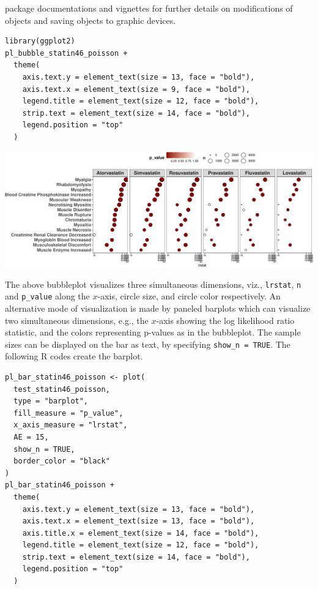 package documentations and vignettes for further details on modifications of  objects and saving  objects to graphic devices.

\begin{verbatim}
library(ggplot2)
pl_bubble_statin46_poisson +
  theme(
    axis.text.y = element_text(size = 13, face = "bold"),
    axis.text.x = element_text(size = 9, face = "bold"),
    legend.title = element_text(size = 12, face = "bold"),
    strip.text = element_text(size = 14, face = "bold"),
    legend.position = "top"
  )
\end{verbatim}

\begin{center}\includegraphics[width=1\linewidth]{pvlrt-package-paper-Rjournal_files/figure-latex/show-heatmap-poisson-statin46-1} \end{center}

The above bubbleplot visualizes three simultaneous dimensions, viz., \texttt{lrstat}, \texttt{n} and \texttt{p\_value} along the \(x\)-axis, circle size, and circle color respectively. An alternative mode of visualization is made by paneled barplots which can visualize two simultaneous dimensions, e.g., the \(x\)-axis showing the log likelihood ratio statistic, and the colors representing p-values as in the bubbleplot. The sample sizes can be displayed on the bar as text, by specifying \texttt{show\_n\ =\ TRUE}. The following R codes create the barplot.

\begin{verbatim}
pl_bar_statin46_poisson <- plot(
  test_statin46_poisson,
  type = "barplot",
  fill_measure = "p_value",
  x_axis_measure = "lrstat",
  AE = 15,
  show_n = TRUE,
  border_color = "black"
) 
pl_bar_statin46_poisson +
  theme(
    axis.text.y = element_text(size = 13, face = "bold"),
    axis.text.x = element_text(size = 13, face = "bold"),
    axis.title.x = element_text(size = 14, face = "bold"),
    legend.title = element_text(size = 12, face = "bold"),
    strip.text = element_text(size = 14, face = "bold"),
    legend.position = "top"
  )
\end{verbatim}

